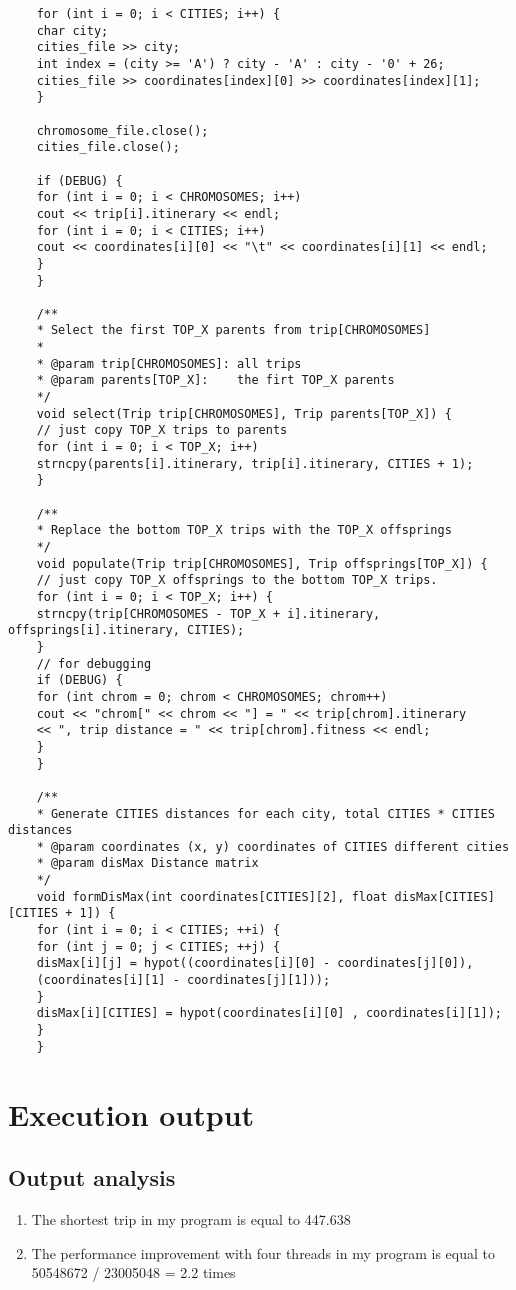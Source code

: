\documentclass[11pt, letterpaper]{article}
\begin{document}
\begin{lstlisting}
	for (int i = 0; i < CITIES; i++) {
	char city;
	cities_file >> city;
	int index = (city >= 'A') ? city - 'A' : city - '0' + 26;
	cities_file >> coordinates[index][0] >> coordinates[index][1];
	}
	
	chromosome_file.close();
	cities_file.close();
	
	if (DEBUG) {
	for (int i = 0; i < CHROMOSOMES; i++)
	cout << trip[i].itinerary << endl;
	for (int i = 0; i < CITIES; i++)
	cout << coordinates[i][0] << "\t" << coordinates[i][1] << endl;
	}
	}
	
	/**
	* Select the first TOP_X parents from trip[CHROMOSOMES]
	*
	* @param trip[CHROMOSOMES]: all trips
	* @param parents[TOP_X]:    the firt TOP_X parents
	*/
	void select(Trip trip[CHROMOSOMES], Trip parents[TOP_X]) {
	// just copy TOP_X trips to parents
	for (int i = 0; i < TOP_X; i++)
	strncpy(parents[i].itinerary, trip[i].itinerary, CITIES + 1);
	}
	
	/**
	* Replace the bottom TOP_X trips with the TOP_X offsprings
	*/
	void populate(Trip trip[CHROMOSOMES], Trip offsprings[TOP_X]) {
	// just copy TOP_X offsprings to the bottom TOP_X trips.
	for (int i = 0; i < TOP_X; i++) {
	strncpy(trip[CHROMOSOMES - TOP_X + i].itinerary, offsprings[i].itinerary, CITIES);
	}
	// for debugging
	if (DEBUG) {
	for (int chrom = 0; chrom < CHROMOSOMES; chrom++)
	cout << "chrom[" << chrom << "] = " << trip[chrom].itinerary
	<< ", trip distance = " << trip[chrom].fitness << endl;
	}
	}
	
	/**
	* Generate CITIES distances for each city, total CITIES * CITIES distances
	* @param coordinates (x, y) coordinates of CITIES different cities
	* @param disMax Distance matrix
	*/
	void formDisMax(int coordinates[CITIES][2], float disMax[CITIES][CITIES + 1]) {
	for (int i = 0; i < CITIES; ++i) {
	for (int j = 0; j < CITIES; ++j) {
	disMax[i][j] = hypot((coordinates[i][0] - coordinates[j][0]),
	(coordinates[i][1] - coordinates[j][1]));
	}
	disMax[i][CITIES] = hypot(coordinates[i][0] , coordinates[i][1]);
	}
	}
	\end{lstlisting}
	
	
	
	\section {Execution output}
	\subsection{Output analysis}
	\begin{enumerate} 
		\item The shortest trip in my program is equal to 447.638
		\item The performance improvement with four threads in my program is equal to 50548672 / 23005048 = 2.2 times
	\end{enumerate}
	
\end{document}

